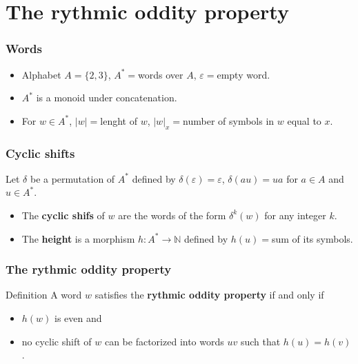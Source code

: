 \documentclass{beamer}
\theoremstyle{definition}
\begin{document}
\section{The rythmic oddity property}

\begin{frame}
\frametitle{Words}
\begin{itemize}
\item<1-> Alphabet $A=\{2,3\}$, $A^*=$words over $A$, $\varepsilon=$empty word. 
\item<2-> $A^*$ is a monoid under concatenation.
\item<3-> For $w\in A^*$, $|w|=$lenght of $w$, $|w|_x=$number of symbols in $w$ equal to $x$.
\end{itemize}
\end{frame}

\begin{frame}
\frametitle{Cyclic shifts}
Let $\delta$ be a permutation of $A^*$ defined by $\delta(\varepsilon)=\varepsilon$, $\delta(au)=ua$ for $a\in A$ and $u\in A^*$.

\begin{itemize}
\item<1-> The \textbf{cyclic shifs} of $w$ are the words of the form $\delta^k(w)$ for any integer $k$.
\end{itemize} 


\begin{itemize}
\item<3-> The \textbf{height} is a morphism $h:A^*\to\mathbb{N}$ defined by $h(u)=$sum of its symbols.
\end{itemize} 
\end{frame}

\begin{frame}
\frametitle{The rythmic oddity property}
\begin{alertblock}{Definition}
A word $w$ satisfies the \textbf{rythmic oddity property} if and only if
\begin{itemize}
\item $h(w)$ is even and
\item no cyclic shift of $w$ can be factorized into words $uv$ such that $h(u)=h(v)$. 
\end{itemize}
\end{alertblock}
\end{frame}
\end{document}
